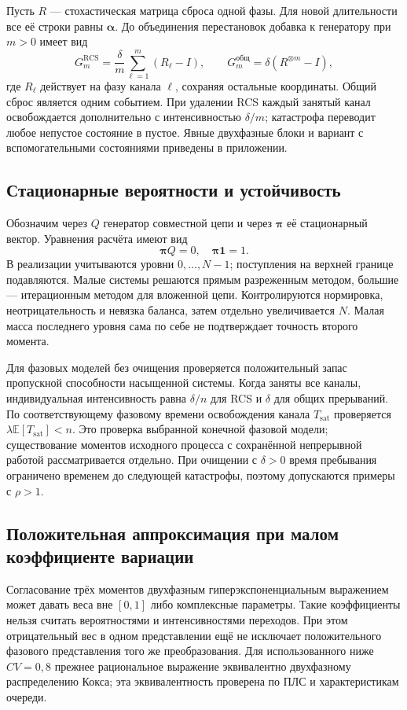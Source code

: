 \documentclass[a4paper,12pt]{article}
\begin{document}
Пусть \(R\) --- стохастическая матрица сброса одной фазы. Для новой длительности все её строки равны \(\boldsymbol\alpha\). До объединения перестановок добавка к генератору при \(m>0\) имеет вид
\[
G_m^{\mathrm{RCS}}=\frac{\delta}{m}\sum_{\ell=1}^{m}(R_\ell-I),\qquad
G_m^{\text{общ}}=\delta(R^{\otimes m}-I),
\]
где \(R_\ell\) действует на фазу канала \(\ell\), сохраняя остальные координаты. Общий сброс является одним событием. При удалении RCS каждый занятый канал освобождается дополнительно с интенсивностью \(\delta/m\); катастрофа переводит любое непустое состояние в пустое. Явные двухфазные блоки и вариант с вспомогательными состояниями приведены в приложении.

\subsection{Стационарные вероятности и устойчивость}
Обозначим через \(Q\) генератор совместной цепи и через \(\boldsymbol\pi\) её стационарный вектор. Уравнения расчёта имеют вид
\[
\boldsymbol\pi Q=0,\quad \boldsymbol\pi\mathbf1=1.
\]
В реализации учитываются уровни \(0,\ldots,N-1\); поступления на верхней границе подавляются. Малые системы решаются прямым разреженным методом, большие --- итерационным методом для вложенной цепи. Контролируются нормировка, неотрицательность и невязка баланса, затем отдельно увеличивается \(N\). Малая масса последнего уровня сама по себе не подтверждает точность второго момента.

Для фазовых моделей без очищения проверяется положительный запас пропускной способности насыщенной системы. Когда заняты все каналы, индивидуальная интенсивность равна \(\delta/n\) для RCS и \(\delta\) для общих прерываний. По соответствующему фазовому времени освобождения канала \(T_{\mathrm{sat}}\) проверяется \(\lambda\mathbb E[T_{\mathrm{sat}}]<n\). Это проверка выбранной конечной фазовой модели; существование моментов исходного процесса с сохранённой непрерывной работой рассматривается отдельно. При очищении с \(\delta>0\) время пребывания ограничено временем до следующей катастрофы, поэтому допускаются примеры с \(\rho>1\).

\subsection{Положительная аппроксимация при малом коэффициенте вариации}
Согласование трёх моментов двухфазным гиперэкспоненциальным выражением может давать веса вне \([0,1]\) либо комплексные параметры. Такие коэффициенты нельзя считать вероятностями и интенсивностями переходов. При этом отрицательный вес в одном представлении ещё не исключает положительного фазового представления того же преобразования. Для использованного ниже \(CV=0{,}8\) прежнее рациональное выражение эквивалентно двухфазному распределению Кокса; эта эквивалентность проверена по ПЛС и характеристикам очереди.
\end{document}
